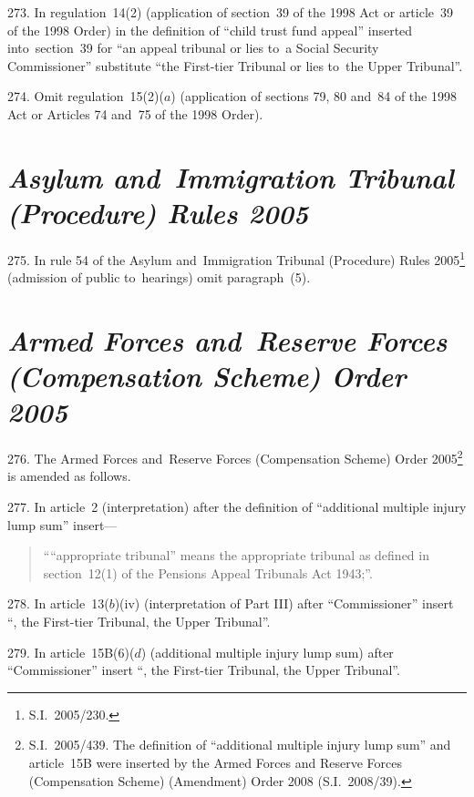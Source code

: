 \documentclass[12pt,a4paper]{article}
\begin{document}
\medskip

273.  In regulation~14(2) (application of section~39 of the 1998 Act or article~39 of the 1998 Order) in the definition of “child trust fund appeal” inserted into~section~39 for “an appeal tribunal or lies to~a Social Security Commissioner” substitute “the First-tier Tribunal or lies to~the Upper Tribunal”.

\medskip

274.  Omit regulation~15(2)($a$)  (application of sections 79, 80 and~84 of the 1998 Act or Articles 74 and~75 of the 1998 Order).

\section*{\itshape\sloppy Asylum and~Immigration Tribunal (Procedure) Rules 2005}

275.  In rule 54 of the Asylum and~Immigration Tribunal (Procedure) Rules 2005\footnote{S.I.~2005/230.} (admission of public to~hearings) omit paragraph~(5).

\section*{\itshape Armed Forces and~Reserve Forces (Compensation Scheme) Order 2005}

276.  The Armed Forces and~Reserve Forces (Compensation Scheme) Order 2005\footnote{S.I.~2005/439. The definition of “additional multiple injury lump sum” and article~15B were inserted by the Armed Forces and Reserve Forces (Compensation Scheme) (Amendment) Order 2008 (S.I.~2008/39).} is amended as follows.

\medskip

277.  In article~2 (interpretation) after the definition of “additional multiple injury lump sum” insert—
\begin{quotation}
““appropriate tribunal” means the appropriate tribunal as defined in section~12(1) of the Pensions Appeal Tribunals Act 1943;”.
\end{quotation}

\medskip

278.  In article~13($b$)(iv)  (interpretation of Part III) after “Commissioner” insert “, the First-tier Tribunal, the Upper Tribunal”.

\medskip

279.  In article~15B(6)($d$)  (additional multiple injury lump sum) after “Commissioner” insert “, the First-tier Tribunal, the Upper Tribunal”.
\end{document}
